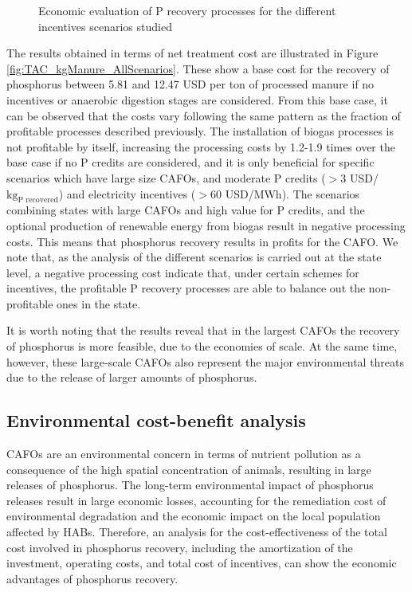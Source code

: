 \begin{refsection}[referencesCh5]
\begin{figure}[h]
	\caption{Economic evaluation of P recovery processes for the different incentives scenarios studied}
	\label{fig:AllScenarios}
\end{figure}

The results obtained in terms of net treatment cost are illustrated in Figure \ref{fig:TAC_kgManure_AllScenarios}. These  show a base cost for the recovery of phosphorus between 5.81 and 12.47 USD per ton of processed manure if no incentives or anaerobic digestion stages are considered. From this base case, it can be observed that the costs vary following the same pattern as the fraction of profitable processes described previously. The installation of biogas processes is not profitable by itself, increasing the processing costs by 1.2-1.9 times over the base case if no P credits are considered, and it is only beneficial for specific scenarios which have large size CAFOs, and moderate P credits ($>$3 USD/${\text{kg}_\text{P recovered}}$) and electricity incentives ($>$60 USD/MWh). The scenarios combining states with large CAFOs and high value for P credits, and the optional production of renewable energy from biogas result in negative processing costs. This means that phosphorus recovery results in profits for the CAFO. We note that, as the analysis of the different scenarios is carried out at the state level, a negative processing cost indicate that, under certain schemes for incentives, the profitable P recovery processes are able to balance out the non-profitable ones in the state.

It is worth noting that the results reveal that in the largest CAFOs the recovery of phosphorus is more feasible, due to the economies of scale. At the same time, however, these large-scale CAFOs also represent the major environmental threats due to the release of larger amounts of phosphorus.

\subsection{Environmental cost-benefit analysis}
CAFOs are an environmental concern in terms of nutrient pollution as a consequence of the high spatial concentration of animals, resulting in large releases of phosphorus. 
The long-term environmental impact of phosphorus releases result in large economic losses, accounting for the remediation cost of environmental degradation and the economic impact on the local population affected by HABs. Therefore, an analysis for the cost-effectiveness of the total cost involved in phosphorus recovery, including the amortization of the investment, operating costs, and total cost of incentives, can show the economic advantages of phosphorus recovery. 


\end{refsection}
